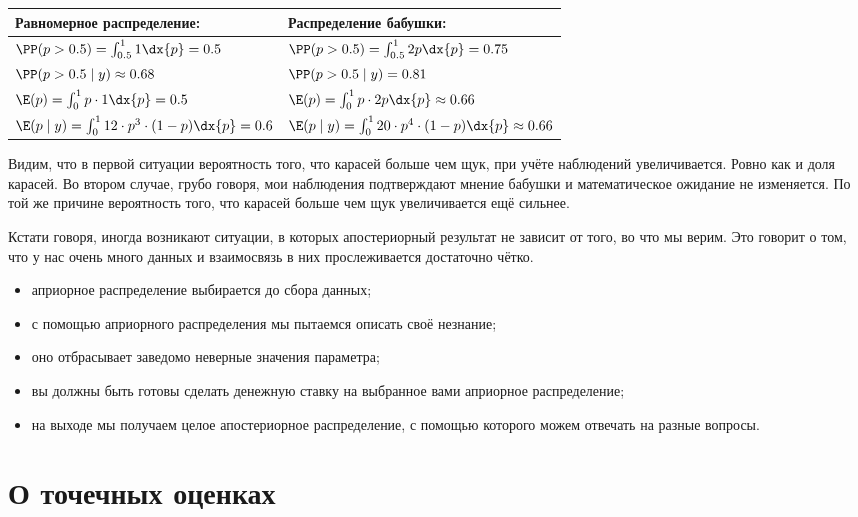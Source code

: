 \documentclass[12pt, a4paper, oneside]{article}
\begin{document}
\begin{table}[H]
	\begin{tabularx}{\textwidth}{@{}XX@{}}
		\toprule
		Равномерное распределение: & Распределение бабушки: \\
		\midrule
		$ \PP( p > 0.5 ) = \int_{0.5}^1 1 \dx{p} = 0.5 $  &   $ \PP( p > 0.5 ) = \int_{0.5}^1 2p \dx{p} = 0.75 $ \\
		$\PP( p > 0.5 \mid y) \approx 0.68  $& $\PP( p > 0.5 \mid y) =  0.81 $  \\
		$\E(p) = \int_0^1 p \cdot 1 \dx{p} = 0.5 $ & $ \E(p) = \int_0^1 p \cdot 2p \dx{p}  \approx 0.66 $  \\
		$\E(p \mid y) = \int_0^1 12 \cdot p^3 \cdot (1-p) \dx{p} = 0.6$ & $\E(p \mid y) = \int_0^1 20  \cdot p^4 \cdot (1-p) \dx{p} \approx 0.66$ \\
		\bottomrule
	\end{tabularx}
\end{table}

Видим, что в первой ситуации вероятность того, что карасей больше чем щук, при учёте наблюдений увеличивается. Ровно как и доля карасей. Во втором случае, грубо говоря,  мои наблюдения подтверждают мнение бабушки и математическое ожидание не изменяется. По той же причине вероятность того, что карасей больше чем щук увеличивается ещё сильнее.

Кстати говоря, иногда возникают ситуации, в которых апостериорный результат не зависит от того, во что мы верим. Это говорит о том, что у нас очень много данных и взаимосвязь в них прослеживается достаточно чётко.


\begin{itemize}
	\item  априорное распределение выбирается до сбора данных;
	\item  с помощью априорного распределения мы пытаемся описать своё незнание;
	\item  оно отбрасывает заведомо неверные значения параметра;
	\item  вы должны быть готовы сделать денежную ставку на выбранное вами априорное распределение;
	\item  на выходе мы получаем целое апостериорное распределение, с помощью которого можем отвечать на разные вопросы.
\end{itemize}


\section*{О точечных оценках}
\end{document}
